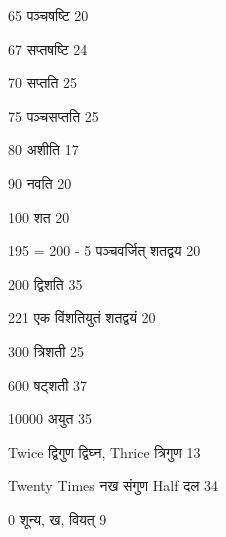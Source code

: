 \documentclass[]{article}
\begin{document}
{65 पञ्चषष्टि 20}

{67 सप्तषष्टि 24}

{70 सप्तति 25}

{75 पञ्चसप्तति 25}

{80 अशीति 17}

{90 नवति 20}

{100 शत 20}

{195 = 200 - 5 पञ्चवर्जित् शतद्वय 20}

{200 द्विशति 35}

{221 एक विंशतियुतं शतद्वयं 20}

{300 त्रिशती 25}

{600 षट्शती 37}

{10000 अयुत 35}

{Twice द्विगुण द्विघ्न, Thrice त्रिगुण 13}

{Twenty Times नख संगुण Half दल 34}

{0 शून्य, ख, वियत् 9 }
\end{document}
